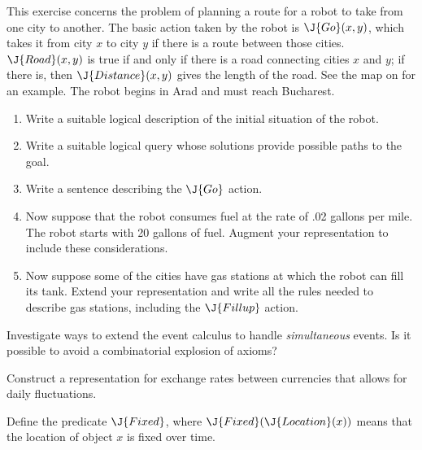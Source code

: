 \begin{iexercise}
This exercise concerns the problem of planning a route for
a robot to take from one city to another. The basic action taken by
the robot is \(\J{Go}(x,y)\), which takes it from city \(x\) to city \(y\) if
there is a route between those cities.  \(\J{Road}(x, y)\) is
true if and only if there is a road connecting cities \(x\) and \(y\); if
there is, then \(\J{Distance}(x, y)\) gives the length of the road.
See the map on  for an example. The robot begins in Arad and must
reach Bucharest.
\begin{enumerate}
\item  Write a suitable logical description of the initial 
situation of the robot.
\item  Write a suitable logical query whose solutions  provide
possible paths to the goal.
\item  Write a sentence describing the \(\J{Go}\) action.
\item  Now suppose that the robot consumes fuel at the rate of .02 gallons per mile.
The robot starts with 20 gallons of fuel.  Augment your representation to
include these considerations. 
\item Now suppose some of the cities have gas stations at which
the robot can fill its tank.  Extend your representation and write all
the rules needed to describe gas stations, including the \(\J{Fillup}\)
action.
\end{enumerate}
\end{iexercise} 

\begin{exercise}\libex%
Investigate ways to extend the event calculus to handle {\em simultaneous} events.
Is it possible to avoid a combinatorial explosion of axioms?
\end{exercise} 

\begin{exercise}%
Construct a representation for exchange rates between currencies that allows
for daily fluctuations.
\end{exercise} 

\begin{exercise}%
Define the predicate \(\J{Fixed}\), where \(\J{Fixed}(\J{Location}(x))\) means that
the location of object \(x\) is fixed over time.
\end{exercise} 

